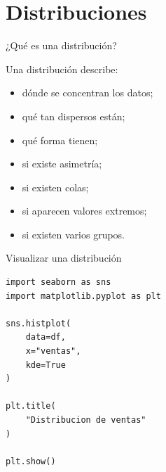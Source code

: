 \documentclass[aspectratio=169,11pt]{beamer}
\begin{document}
\section{Distribuciones}

\begin{frame}{¿Qué es una distribución?}

Una distribución describe:

\begin{itemize}

    \item dónde se concentran los datos;

    \item qué tan dispersos están;

    \item qué forma tienen;

    \item si existe asimetría;

    \item si existen colas;

    \item si aparecen valores extremos;

    \item si existen varios grupos.

\end{itemize}

\end{frame}


\begin{frame}[fragile]{Visualizar una distribución}

\begin{lstlisting}
import seaborn as sns
import matplotlib.pyplot as plt

sns.histplot(
    data=df,
    x="ventas",
    kde=True
)

plt.title(
    "Distribucion de ventas"
)

plt.show()
\end{lstlisting}

\end{frame}

\end{document}
